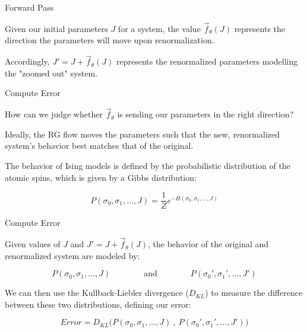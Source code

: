 \documentclass[aspectratio=169, 12pt]{beamer}
\begin{document}
\begin{frame}{Forward Pass}

    Given our initial parameters $J$ for a system, the value $\vec{f}_\theta(J)$ represents the direction the parameters will move upon renormalization. 

    \vspace{1em}

    Accordingly, $J' = J + \vec{f}_\theta(J)$ represents the renormalized parameters modelling the "zoomed out" system. 

\end{frame}

\begin{frame}{Compute Error}

    How can we judge whether $\vec{f}_\theta$ is sending our parameters in the right direction?

    \vspace{1em}

    Ideally, the RG flow moves the parameters such that the new, renormalized system's behavior best matches that of the original. 

    \vspace{1em}

    The behavior of Ising models is defined by the probabilistic distribution of the atomic spins, which is given by a Gibbs distribution:

    \[
    P(\sigma_0, \sigma_1, \dots, J) = \frac{1}{Z} e^{-H(\sigma_0, \sigma_1, \dots, J)}
    \]

\end{frame}

\begin{frame}{Compute Error}

    Given values of $J$ and $J' = J + \vec{f}_\theta(J)$, the behavior of the original and renormalized system are modeled by:

    \[
    P(\sigma_0, \sigma_1, \dots, J) 
    \qquad \qquad \text{and} \qquad \qquad
    P(\sigma_0', \sigma_1', \dots, J') 
    \]

    We can then use the Kullback-Liebler divergence ($D_{KL}$) to measure the difference between these two distributions, defining our error:

    \[
    Error = D_{KL} \Biggr (
    P(\sigma_0, \sigma_1, \dots, J)
    \: , \: 
    P(\sigma_0', \sigma_1', \dots, J') 
    \Biggr)
    \]

\end{frame}
\end{document}
